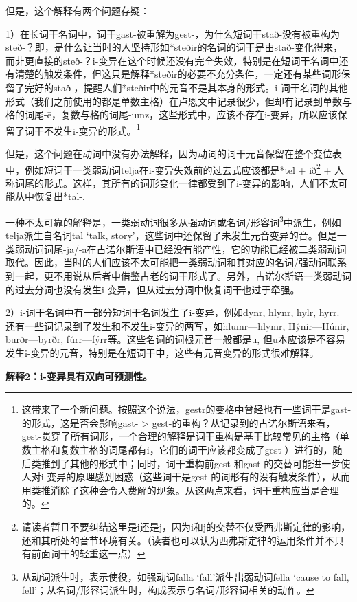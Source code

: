 {{但是，这个解释有两个问题存疑：

1）在长词干名词中，词干gast-被重解为gest-，为什么短词干stað-没有被重构为steð-？即，是什么让当时的人坚持形如*steðir的名词的词干是由stað-变化得来，而非更直接的steð-？i-变异在这个时候还没有完全失效，特别是在短词干名词中还有清楚的触发条件，但这只是解释*steðir的必要不充分条件，一定还有某些词形保留了完好的stað-，提醒人们*steðir中的元音不是其本身的形式。i-词干名词的其他形式（我们之前使用的都是单数主格）在卢恩文中记录很少，但却有记录到单数与格的词尾-ē，复数与格的词尾-umz，这些形式中，应该不存在i-变异，所以应该保留了词干不发生i-变异的形式。\footnote{这带来了一个新问题。按照这个说法，gestr的变格中曾经也有一些词干是gast-的形式，这是否会影响gast-
  \textgreater{}
  gest-的重构？从记录到的古诺尔斯语来看，gest-贯穿了所有词形，一个合理的解释是词干重构是基于比较常见的主格（单数主格和复数主格的词尾都有i，它们的词干应该都变成了gest-）进行的，随后类推到了其他的形式中；同时，词干重构前gest-和gast-的交替可能进一步使人对i-变异的原理感到困惑（这些词干是gest-的词形有的没有触发条件），从而用类推消除了这种会令人费解的现象。从这两点来看，词干重构应当是合理的。}

但是，这个问题在动词中没有办法解释，因为动词的词干元音保留在整个变位表中，例如短词干一类弱动词telja在i-变异失效前的过去式应该都是*tel
+ ið\footnote{请读者暂且不要纠结这里是i还是j，因为i和j的交替不仅受西弗斯定律的影响，还和其所处的音节环境有关。（读者也可以认为西弗斯定律的运用条件并不只有前面词干的轻重这一点）}
+
人称词尾的形式。这样，其所有的词形变化一律都受到了i-变异的影响，人们不太可能从中恢复出*tal-.

一种不太可靠的解释是，一类弱动词很多从强动词或名词/形容词\footnote{从动词派生时，表示使役，如强动词falla
  `fall'派生出弱动词fella `cause to fall,
  fell'；从名词/形容词派生时，构成表示与名词/形容词相关的动作。}中派生，例如telja派生自名词tal
`talk,
story'，这些词中还保留了未发生元音变异的音。但是一类弱动词词尾-ja/-a在古诺尔斯语中已经没有能产性，它的功能已经被二类弱动词取代。因此，当时的人们应该不太可能把一类弱动词和其对应的名词/强动词联系到一起，更不用说从后者中借鉴古老的词干形式了。另外，古诺尔斯语一类弱动词的过去分词也没有发生i-变异，但从过去分词中恢复词干也过于牵强。

2）i-词干名词中有一部分短词干名词发生了i-变异，例如dynr, hlynr, hylr,
hyrr. 还有一些词记录到了发生和不发生i-变异的两写，如hlumr---hlymr,
Hýnir---Húnir, burðr---byrðr,
fúrr---fýrr等。这些名词的词根元音一般都是u,
但u本应该是不容易发生i-变异的元音，特别是在短词干中，这些有元音变异的形式很难解释。

\textbf{解释2：i-变异具有双向可预测性。}

}}
